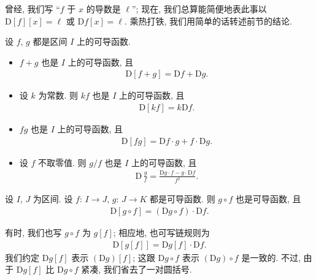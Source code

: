 曾经, 我们写 ``$f$ 于 $x$ 的导数是 $\ell$'';
现在, 我们总算能简便地表此事以
$\mathrm{D}[f][x] = \ell$ 或 $\mathrm{D}f[x] = \ell$.
乘热打铁, 我们用简单的话转述前节的结论.

\begin{theorem}
    设 $f$, $g$ 都是区间 $I$ 上的可导函数.
    \begin{itemize}
        \item $f + g$ 也是 $I$ 上的可导函数, 且
              \begin{align*}
                  \mathrm{D} [f + g] = \mathrm{D} f + \mathrm{D} g.
              \end{align*}
        \item 设 $k$ 为常数.
              则 $kf$ 也是 $I$ 上的可导函数, 且
              \begin{align*}
                  \mathrm{D} [kf] = k\mathrm{D} f.
              \end{align*}
        \item $fg$ 也是 $I$ 上的可导函数, 且
              \begin{align*}
                  \mathrm{D} [fg] = \mathrm{D} f \cdot g + f \cdot \mathrm{D} g.
              \end{align*}
        \item 设 $f$ 不取零值.
              则 $g/f$ 也是 $I$ 上的可导函数, 且
              \begin{align*}
                  \mathrm{D}\, \frac{g}{f} = \frac{\mathrm{D} g \cdot f - g \cdot \mathrm{D} f}{f^2}.
              \end{align*}
    \end{itemize}
\end{theorem}

\begin{theorem}
    设 $I$, $J$ 为区间.
    设 $f$: $I \to J$, $g$: $J \to K$ 都是可导函数.
    则 $g \circ f$ 也是可导函数, 且
    \begin{align*}
        \mathrm{D} [g \circ f] = (\mathrm{D}g \circ f) \cdot \mathrm{D}f.
    \end{align*}
\end{theorem}

\begin{remark}
    有时, 我们也写 $g \circ f$ 为 $g[f]$;
    相应地, 也可写链规则为
    \begin{align*}
        \mathrm{D} [g[f]] = \mathrm{D}g[f] \cdot \mathrm{D}f.
    \end{align*}
    我们约定 $\mathrm{D}g[f]$ 表示 $(\mathrm{D}g)[f]$;
    这跟 $\mathrm{D}g \circ f$ 表示
    $(\mathrm{D}g) \circ f$ 是一致的.
    不过, 由于 $\mathrm{D}g[f]$ 比 $\mathrm{D}g \circ f$ 紧凑,
    我们省去了一对圆括号.
\end{remark}

